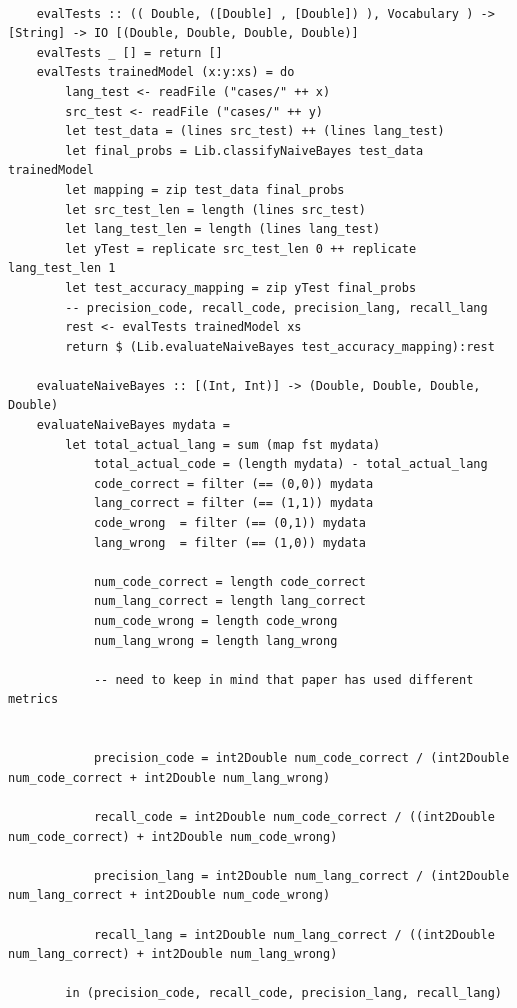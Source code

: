 \documentclass[12pt]{scrreprt}
\begin{document}
\begin{verbatim}

    evalTests :: (( Double, ([Double] , [Double]) ), Vocabulary ) -> [String] -> IO [(Double, Double, Double, Double)]
    evalTests _ [] = return []
    evalTests trainedModel (x:y:xs) = do
        lang_test <- readFile ("cases/" ++ x)
        src_test <- readFile ("cases/" ++ y)
        let test_data = (lines src_test) ++ (lines lang_test)
        let final_probs = Lib.classifyNaiveBayes test_data trainedModel
        let mapping = zip test_data final_probs
        let src_test_len = length (lines src_test)
        let lang_test_len = length (lines lang_test)
        let yTest = replicate src_test_len 0 ++ replicate lang_test_len 1
        let test_accuracy_mapping = zip yTest final_probs
        -- precision_code, recall_code, precision_lang, recall_lang
        rest <- evalTests trainedModel xs
        return $ (Lib.evaluateNaiveBayes test_accuracy_mapping):rest

    evaluateNaiveBayes :: [(Int, Int)] -> (Double, Double, Double, Double)
    evaluateNaiveBayes mydata = 
        let total_actual_lang = sum (map fst mydata)
            total_actual_code = (length mydata) - total_actual_lang
            code_correct = filter (== (0,0)) mydata
            lang_correct = filter (== (1,1)) mydata
            code_wrong  = filter (== (0,1)) mydata
            lang_wrong  = filter (== (1,0)) mydata
    
            num_code_correct = length code_correct
            num_lang_correct = length lang_correct
            num_code_wrong = length code_wrong
            num_lang_wrong = length lang_wrong
    
            -- need to keep in mind that paper has used different metrics
            
    
            precision_code = int2Double num_code_correct / (int2Double num_code_correct + int2Double num_lang_wrong)
    
            recall_code = int2Double num_code_correct / ((int2Double num_code_correct) + int2Double num_code_wrong)
    
            precision_lang = int2Double num_lang_correct / (int2Double num_lang_correct + int2Double num_code_wrong)
    
            recall_lang = int2Double num_lang_correct / ((int2Double num_lang_correct) + int2Double num_lang_wrong)
    
        in (precision_code, recall_code, precision_lang, recall_lang)
    
        
   \end{verbatim}
\end{document}
